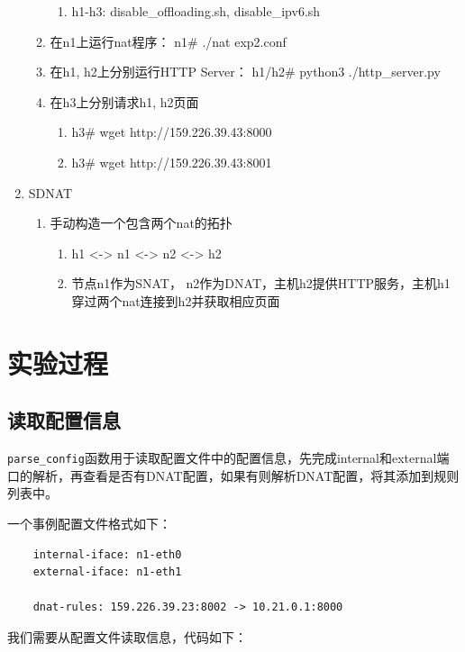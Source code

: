 \documentclass[UTF8]{report}
\begin{document}
\begin{enumerate}
\begin{enumerate}
\begin{enumerate}
            \item h1-h3: disable_offloading.sh, disable_ipv6.sh
        \end{enumerate}
        \item 在n1上运行nat程序：  n1\# ./nat exp2.conf
        \item 在h1, h2上分别运行HTTP Server：   h1/h2\# python3 ./http_server.py
        \item 在h3上分别请求h1, h2页面
        \begin{enumerate}
            \item h3\# wget http://159.226.39.43:8000
            \item h3\# wget http://159.226.39.43:8001
        \end{enumerate}
    \end{enumerate}
    \item SDNAT
    \begin{enumerate}
        \item 手动构造一个包含两个nat的拓扑
        \begin{enumerate}
            \item h1 <-> n1 <-> n2 <-> h2
            \item 节点n1作为SNAT， n2作为DNAT，主机h2提供HTTP服务，主机h1穿过两个nat连接到h2并获取相应页面
        \end{enumerate}
    \end{enumerate}
\end{enumerate}

\section{实验过程}

\subsection{读取配置信息}

\texttt{parse\_config}函数用于读取配置文件中的配置信息，先完成internal和external端口的解析，再查看是否有DNAT配置，如果有则解析DNAT配置，将其添加到规则列表中。

一个事例配置文件格式如下：

\begin{lstlisting}
    internal-iface: n1-eth0
    external-iface: n1-eth1
    
    dnat-rules: 159.226.39.23:8002 -> 10.21.0.1:8000
\end{lstlisting}

我们需要从配置文件读取信息，代码如下：
\end{document}
